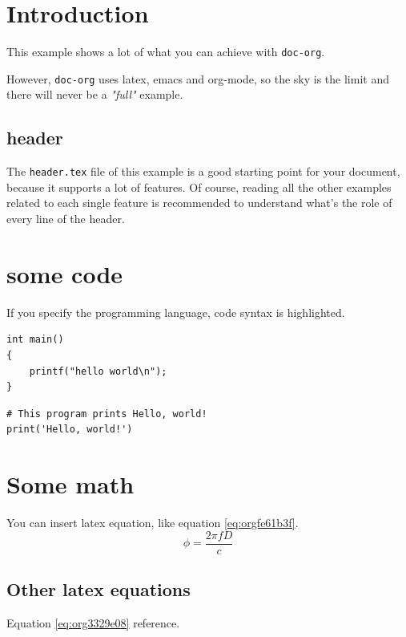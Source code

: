 


\maketitle
\thispagestyle{empty}
\newpage

\tableofcontents
\newpage

\pagestyle{plain}

\section{Introduction}
\label{sec:org0202825}
This example shows a lot of what you can achieve with \texttt{doc-org}.

However, \texttt{doc-org} uses latex, emacs and org-mode, so the sky is the limit and
there will never be a \emph{"full"} example.

\subsection{header}
\label{sec:org8f45262}
The \texttt{header.tex} file of this example is a good starting point for your
document, because it supports a lot of features.
Of course, reading all the other examples related to each single feature is
recommended to understand what's the role of every line of the header.
\section{some code}
\label{sec:orgec88ca2}
If you specify the programming language, code syntax is highlighted.
\begin{verbatim}
int main()
{
    printf("hello world\n");
}
\end{verbatim}

\begin{verbatim}
# This program prints Hello, world!
print('Hello, world!')
\end{verbatim}

\section{Some math}
\label{sec:org2eb0bd2}
You can insert latex equation, like equation \ref{eq:orgfe61b3f}.
\begin{equation}
\label{eq:orgfe61b3f}
\phi = \frac{2\pi fD}{c}
\end{equation}
\subsection{Other latex equations}
\label{sec:org142d3ce}
Equation \ref{eq:org3329e08} reference.


